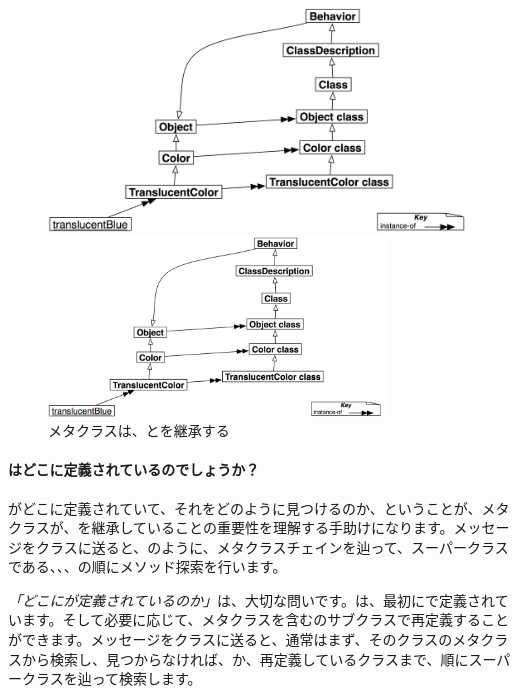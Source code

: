 \documentclass[a4paper,10pt,twoside]{book}
\begin{document}
\begin{center}
\begin{figure}
\ifluluelse
	{\centerline{\includegraphics[width=\textwidth]{TranslucentBehavior}}}
	{\centerline{\includegraphics[width=0.8\textwidth]{TranslucentBehavior}}}
\caption{メタクラスは、とを継承する}
\end{figure}
\end{center}

\paragraph{はどこに定義されているのでしょうか？}
がどこに定義されていて、それをどのように見つけるのか、ということが、メタクラスが、を継承していることの重要性を理解する手助けになります。メッセージをクラスに送ると、のように、メタクラスチェインを辿って、スーパークラスである、、、の順にメソッド探索を行います。

\emph{「どこにが定義されているのか」}は、大切な問いです。は、最初にで定義されています。そして必要に応じて、メタクラスを含むのサブクラスで再定義することができます。メッセージをクラスに送ると、通常はまず、そのクラスのメタクラスから検索し、見つからなければ、か、再定義しているクラスまで、順にスーパークラスを辿って検索します。
\end{document}
